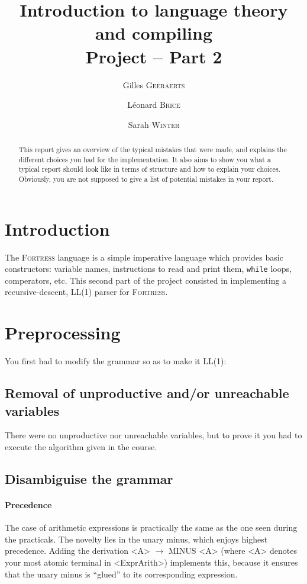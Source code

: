 \documentclass[a4paper]{scrartcl}
\title{Introduction to language theory and compiling\\
  Project -- Part 2}
\author{Gilles {\scshape{Geeraerts}}\and Léonard {\scshape{Brice}} \and
  Sarah {\scshape{Winter}}}
\newcommand{\mylanguage}{{\scshape{Fortress}}\xspace}
\begin{document}
\maketitle


\begin{abstract}
This report gives an overview of the typical mistakes that were made, and explains the different choices you had for the implementation. It also aims to show you what a typical report should look like in terms of structure and how to explain your choices. Obviously, you are not supposed to give a list of potential mistakes in your report.
\end{abstract}

\section{Introduction}

The \mylanguage language is a simple imperative language which provides basic constructors: variable names, instructions to read and print them, \texttt{while} loops, comperators, etc. This second part of the project consisted in implementing a recursive-descent, LL(1) parser for \mylanguage.

\section{Preprocessing}

You first had to modify the grammar so as to make it LL(1):

\subsection{Removal of unproductive and/or unreachable variables}

There were no unproductive nor unreachable variables, but to prove it you had to execute the algorithm given in the course.

\subsection{Disambiguise the grammar}

\paragraph{Precedence}
The case of arithmetic expressions is practically the same as the one seen during the practicals. The novelty lies in the unary minus, which enjoys highest precedence. Adding the derivation <A> $\rightarrow$ MINUS <A> (where <A> denotes your most atomic terminal in <ExprArith>) implements this, because it ensures that the unary minus is ``glued'' to its corresponding expression.
\end{document}
